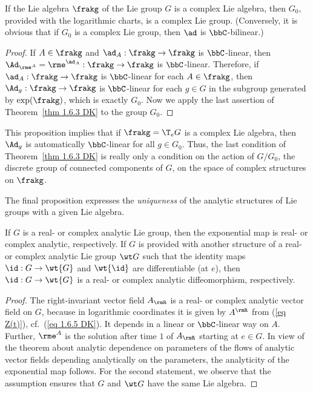 \begin{prop}[{{\cite[Prop.~1.9.4]{DK}}}]
    If the Lie algebra $\frakg$ of the Lie group $G$ is a complex Lie algebra, then $G_0$, provided with the logarithmic charts, is a complex Lie group. (Conversely, it is obvious that if $G_0$ is a complex Lie group, then $\ad$ is $\bbC$-bilinear.)
\end{prop}
\begin{proof}
    If $A\in\frakg$ and $\ad_A:\frakg\to \frakg$ is $\bbC$-linear, then $\Ad_{\rme^A}=\rme^{\ad_A}:\frakg\to\frakg$ is $\bbC$-linear. Therefore, if $\ad_A:\frakg\to\frakg$ is $\bbC$-linear for each $A\in\frakg$, then $\Ad_g:\frakg\to\frakg$ is $\bbC$-linear for each $g\in G$ in the subgroup generated by $\exp(\frakg)$, which is exactly $G_0$. Now we apply the last assertion of Theorem~\ref{thm 1.6.3 DK} to the group $G_0$.
\end{proof}

This proposition implies that if $\frakg=\T_e G$ is a complex Lie algebra, then $\Ad_g$ is automatically $\bbC$-linear for all $g\in G_0$. Thus, the last condition of Theorem~\ref{thm 1.6.3 DK} is really only a condition on the action of $G\slash G_0$, the discrete group of connected components of $G$, on the space of complex structures on $\frakg$.

The final proposition expresses the \emph{uniqueness} of the analytic structures of Lie groups with a given Lie algebra.

\begin{prop}[{{\cite[Prop.~1.6.4]{DK}}}]
    If $G$ is a real- or complex analytic Lie group, then the exponential map is real- or complex analytic, respectively. If $G$ is provided with another structure of a real- or complex analytic Lie group $\wt G$ such that the identity maps $\id:G\to \wt{G}$ and $\wt{\id}$ are differentiable (at $e$), then $\id:G\to \wt{G}$ is a real- or complex analytic diffeomorphism, respectively.
\end{prop}
\begin{proof}
    The right-invariant vector field $A_\rmR$ is a real- or complex analytic vector field on $G$, because in logarithmic coordinates it is given by $A^\rmR$ from (\ref{eq Z(t)}), cf.\ (\ref{eq 1.6.5 DK}). It depends in a linear or $\bbC$-linear way on $A$. Further, $\rme^A$ is the solution after time $1$ of $A_\rmR$ starting at $e\in G$. In view of the theorem about analytic dependence on parameters of the flows of analytic vector fields depending analytically on the parameters, the analyticity of the exponential map follows. For the second statement, we observe that the assumption ensures that $G$ and $\wt G$ have the same Lie algebra.
\end{proof}


